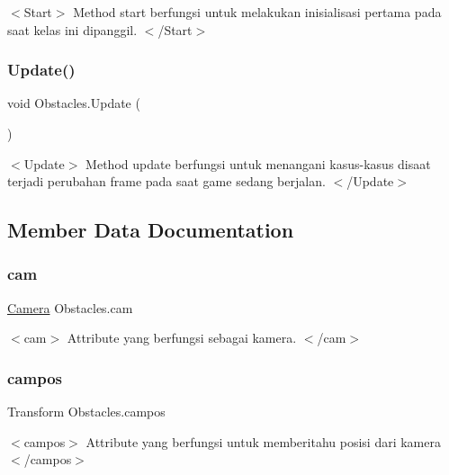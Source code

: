 $<$\+Start$>$ Method start berfungsi untuk melakukan inisialisasi pertama pada saat kelas ini dipanggil. $<$/\+Start$>$ \hypertarget{class_obstacles_a1c654788f161aa4b2057201f35b41b9b}{}\label{class_obstacles_a1c654788f161aa4b2057201f35b41b9b} 
\subsubsection{\texorpdfstring{Update()}{Update()}}
{\footnotesize\ttfamily void Obstacles.\+Update (\begin{DoxyParamCaption}{ }\end{DoxyParamCaption})\hspace{0.3cm}{\ttfamily [private]}}

$<$\+Update$>$ Method update berfungsi untuk menangani kasus-\/kasus disaat terjadi perubahan frame pada saat game sedang berjalan. $<$/\+Update$>$ 

\subsection{Member Data Documentation}
\hypertarget{class_obstacles_aedd2984958638233b3dcc79fe81b0c29}{}\label{class_obstacles_aedd2984958638233b3dcc79fe81b0c29} 
\subsubsection{\texorpdfstring{cam}{cam}}
{\footnotesize\ttfamily \hyperlink{class_camera}{Camera} Obstacles.\+cam}

$<$cam$>$ Attribute yang berfungsi sebagai kamera. $<$/cam$>$ \hypertarget{class_obstacles_ad66e2e7a0d3fbd65343001ad795f8625}{}\label{class_obstacles_ad66e2e7a0d3fbd65343001ad795f8625} 
\subsubsection{\texorpdfstring{campos}{campos}}
{\footnotesize\ttfamily Transform Obstacles.\+campos}

$<$campos$>$ Attribute yang berfungsi untuk memberitahu posisi dari kamera $<$/campos$>$ \hypertarget{class_obstacles_af33a9b1d17f969192cf1c0c5357827c9}{}\label{class_obstacles_af33a9b1d17f969192cf1c0c5357827c9} 
